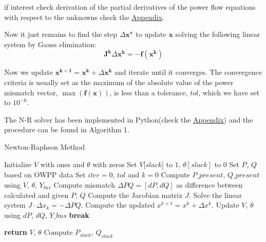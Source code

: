 \documentclass[a4paper,11pt, titlepage, twoside]{article}
\begin{document}
if interest check derivation of the partial derivatives of the power flow equations with respect to the unknowns check the \hyperref[Appendix]{Appendix}.

Now it just remains to find the step $\Delta \mathbf{x^v}$ to update $\mathbf{x}$ solving the following linear system by Gauss elimination:
\begin{equation}
    \mathbf{J^k}\Delta \mathbf{x^k} = -\mathbf{f(x^k)}
\end{equation}

Now we update $\mathbf{x^{k+1}}=\mathbf{x^{k}}+\Delta \mathbf{x^k}$ and iterate until it converges. The convergence criteria is usually set as the maximum of the absolute value of the power mismatch vector, $\max(\mathbf{f(x)})$, is less than a tolerance, $tol$, 
which we have set to $10^{-6}$.







The N-R solver has been implemented in Python(check the \hyperref[Appendix]{Appendix}) and the procedure can be found in Algorithm 1.
\begin{algorithm}[H]
    \caption{Newton-Raphson Method}
    \begin{algorithmic}
        \State Initialize $V$ with ones and $\theta$ with zeros
        \Statex \hspace{\algorithmicindent}Set $V[slack$] to $1$, $\theta[slack]$ to $0$
        \Statex \hspace{\algorithmicindent}Set $P_{}$, $Q_{}$ based on OWPP data
        \Statex \hspace{\algorithmicindent}Set $iter = 0 $, $tol$ and $k = 0$
            \State Compute $P\_present$, $Q\_present$ using $V$, $\theta$, $Y_{bus}$
            \State Compute mismatch $\Delta PQ = [dP, dQ]$ as difference between calculated and given $P$, $Q$
            \State Compute the Jacobian matrix $J$.
            \State Solve the linear system $J \cdot \Delta x_k = -\Delta PQ$.
            \State Compute the updated $x^{k+1} = x^{k} + \Delta x^k $.
            \State Update $V$, $\theta$ using $dP$, $dQ$, $Y\_bus$
                \State \textbf{break}
            \EndIf
            
        \EndWhile
        \State \textbf{return} $V$, $\theta$
        \State Compute $P_{slack}$, $Q_{slack}$
    \EndProcedure
    \end{algorithmic}
    \end{algorithm}
\end{document}
